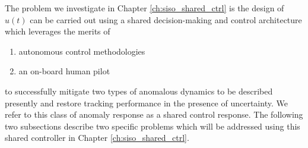 The problem we investigate in Chapter \ref{ch:siso_shared_ctrl} is the design of $u(t)$ can be carried out using a shared decision-making and control architecture which leverages the merits of 
\begin{enumerate}[label=(\alph*)]
	\item autonomous control methodologies
	\item an on-board human pilot
\end{enumerate}
to successfully mitigate two types of anomalous dynamics to be described presently and restore tracking performance in the presence of uncertainty. We refer to this class of anomaly response as a shared control response. The following two subsections describe two specific problems which will be addressed using this shared controller in Chapter \ref{ch:siso_shared_ctrl}.

